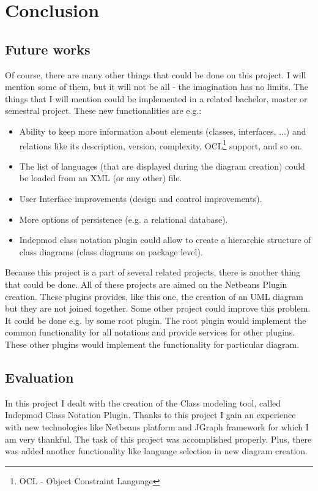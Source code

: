 \chapter{Conclusion}

\section{Future works}

Of course, there are many other things that could be done on this project. I will mention some of them, but it will not be all - the imagination has no limits. The things that I will mention could be implemented in a related bachelor, master or semestral project. These new functionalities are e.g.:

\begin{itemize}
    \item Ability to keep more information about elements (classes, interfaces, ...) and relations like its description, version, complexity, OCL\footnote{OCL - Object Constraint Language} support, and so on.
    \item The list of languages (that are displayed during the diagram creation) could be loaded from an XML (or any other) file.
    \item User Interface improvements (design and control improvements).
    \item More options of persistence (e.g. a relational database).
    \item Indepmod class notation plugin could allow to create a hierarchic structure of class diagrams (class diagrams on package level).
\end{itemize}

Because this project is a part of several related projects, there is another thing that could be done. All of these projects are aimed on the Netbeans Plugin creation. These plugins provides, like this one, the creation of an UML diagram but they are not joined together. Some other project could improve this problem. It could be done e.g. by some root plugin. The root plugin would implement the common functionality for all notations and provide services for other plugins. These other plugins would implement the functionality for particular diagram.

\section{Evaluation}

In this project I dealt with the creation of the Class modeling tool, called Indepmod Class Notation Plugin. Thanks to this project I gain an experience with new technologies like Netbeans platform and JGraph framework for which I am very thankful. The task of this project was accomplished properly. Plus, there was added another functionality like language selection in new diagram creation.

